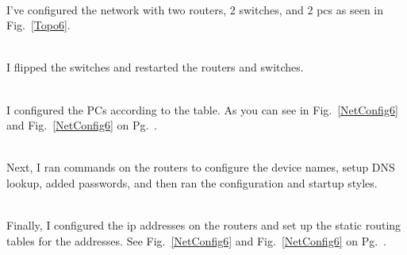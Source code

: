 \documentclass[../EngineeringJournal_CDavis.tex]{subfiles}
\begin{document}
\newpage

\\
I've configured the network with two routers, 2 switches, and 2 pcs as seen in
Fig.~\ref{Topo6}.
\begin{figure}[!hbt]
  \centering
  \par
\end{figure}

\noindent{}\\
I flipped the switches and restarted the routers and switches.


\\
I configured the PCs according to the table. As you can see in
Fig.~\ref{NetConfig6} and
Fig.~\ref{NetConfig6} on Pg.~\pageref{NetConfig6}.


\noindent{}\\
Next, I ran commands on the routers to configure the device names, setup DNS lookup,
added passwords, and then ran the configuration and startup styles.

\noindent{}\\
Finally, I configured the ip addresses on the routers and set up the static routing
tables for the addresses. See Fig.~\ref{NetConfig6} and
Fig.~\ref{NetConfig6} on Pg.~\pageref{NetConfig6}.
\end{document}
